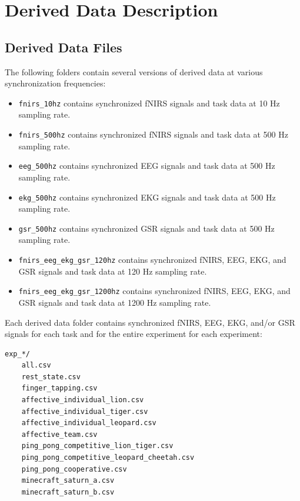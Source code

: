 \section{Derived Data Description}

\subsection{Derived Data Files}

The following folders contain several versions of derived data at various synchronization frequencies:
\begin{itemize}
  \item \texttt{fnirs\_10hz} contains synchronized fNIRS signals and task data at 10 Hz sampling rate.
  \item \texttt{fnirs\_500hz} contains synchronized fNIRS signals and task data at 500 Hz sampling rate.
  \item \texttt{eeg\_500hz} contains synchronized EEG signals and task data at 500 Hz sampling rate.
  \item \texttt{ekg\_500hz} contains synchronized EKG signals and task data at 500 Hz sampling rate.
  \item \texttt{gsr\_500hz} contains synchronized GSR signals and task data at 500 Hz sampling rate.
  \item \texttt{fnirs\_eeg\_ekg\_gsr\_120hz} contains synchronized fNIRS, EEG, EKG, and GSR signals and task data at 120 Hz sampling rate.
  \item \texttt{fnirs\_eeg\_ekg\_gsr\_1200hz} contains synchronized fNIRS, EEG, EKG, and GSR signals and task data at 1200 Hz sampling rate.
\end{itemize}

Each derived data folder contains synchronized fNIRS, EEG, EKG, and/or GSR signals for each task and for the entire experiment for each experiment:
\begin{verbatim}
exp_*/
    all.csv
    rest_state.csv
    finger_tapping.csv
    affective_individual_lion.csv
    affective_individual_tiger.csv
    affective_individual_leopard.csv
    affective_team.csv
    ping_pong_competitive_lion_tiger.csv
    ping_pong_competitive_leopard_cheetah.csv
    ping_pong_cooperative.csv
    minecraft_saturn_a.csv
    minecraft_saturn_b.csv
\end{verbatim}

